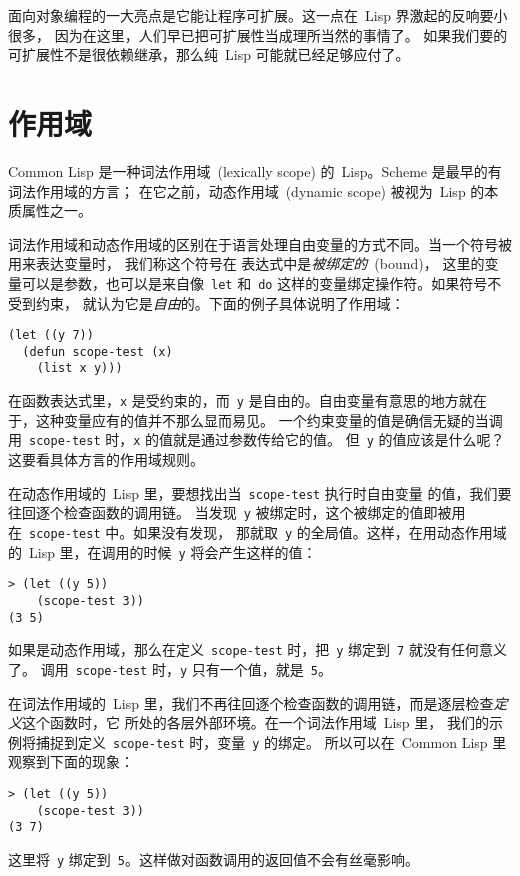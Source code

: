面向对象编程的一大亮点是它能让程序可扩展。这一点在~Lisp 界激起的反响要小很多，
因为在这里，人们早已把可扩展性当成理所当然的事情了。
如果我们要的可扩展性不是很依赖继承，那么纯~Lisp 可能就已经足够应付了。

\section{作用域}
\label{sec:scope}
Common Lisp 是一种词法作用域~(lexically scope)
的~Lisp。Scheme 是最早的有词法作用域的方言；
在它之前，动态作用域~(dynamic scope)
被视为~Lisp 的本质属性之一。

词法作用域和动态作用域的区别在于语言处理自由变量的方式不同。当一个符号被用来表达变量时，
我们称这个符号在
表达式中是\emph{被绑定的}~(bound)，
这里的变量可以是参数，也可以是来自像~\texttt{let} 和~\texttt{do}
这样的变量绑定操作符。如果符号不受到约束，
就认为它是\emph{自由}的。下面的例子具体说明了作用域：
\begin{lstlisting}
(let ((y 7))
  (defun scope-test (x)
    (list x y)))
\end{lstlisting}
在函数表达式里，\verb|x| 是受约束的，而~\verb|y| 是自由的。自由变量有意思的地方就在于，这种变量应有的值并不那么显而易见。
一个约束变量的值是确信无疑的\pozhehao{}当调用~\verb|scope-test| 时，\verb|x| 的值就是通过参数传给它的值。
但~\verb|y| 的值应该是什么呢？这要看具体方言的作用域规则。

在动态作用域的~Lisp 里，要想找出当~\texttt{scope-test} 执行时自由变量
的值，我们要往回逐个检查函数的调用链。
当发现~\verb|y| 被绑定时，这个被绑定的值即被用在~\texttt{scope-test} 中。如果没有发现，
那就取~\verb|y| 的全局值。这样，在用动态作用域的~Lisp 里，在调用的时候~\verb|y| 将会产生这样的值：
\begin{lstlisting}
> (let ((y 5))
    (scope-test 3))
(3 5)
\end{lstlisting}
如果是动态作用域，那么在定义~\texttt{scope-test} 时，把~\verb|y| 绑定到~\verb|7| 就没有任何意义了。
调用~\texttt{scope-test} 时，\verb|y| 只有一个值，就是~\verb|5|。

在词法作用域的~Lisp 里，我们不再往回逐个检查函数的调用链，而是逐层检查\emph{定义}这个函数时，它
所处的各层外部环境。在一个词法作用域~Lisp 里，
我们的示例将捕捉到定义~\texttt{scope-test} 时，变量~\verb|y| 的绑定。
所以可以在~Common Lisp 里观察到下面的现象：
\begin{lstlisting}
> (let ((y 5))
    (scope-test 3))
(3 7)
\end{lstlisting}
这里将~\verb|y| 绑定到~\verb|5|。这样做对函数调用的返回值不会有丝毫影响。


